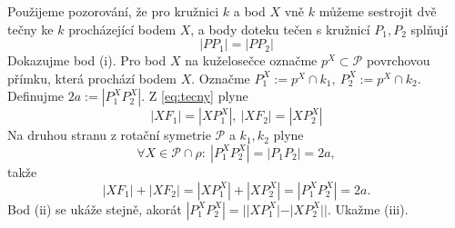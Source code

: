 \begin{důkaz}
  Použijeme pozorování, že pro kružnici $k$ a bod $X$ vně $k$ můžeme sestrojit dvě tečny ke $k$ procházející bodem $X$, a body doteku tečen s kružnicí $P_1, P_2$ splňují
  \begin{equation}\label{eq:tecny}
    |PP_1|=|PP_2|
  \end{equation}
  Dokazujme bod (i). Pro bod $X$ na kuželosečce označme $p^X\subset \mathcal{P}$ povrchovou přímku, která prochází bodem $X$. Označme $P_1^X:=p^X\cap k_1,\ P_2^X:=p^X\cap k_2.$ Definujme $2a:=|P_1^XP_2^X|.$ Z \ref{eq:tecny} plyne
  \begin{equation*}
    |XF_1|=|XP_1^X|,\ |XF_2|=|XP_2^X|  
\end{equation*}
  Na druhou stranu z rotační symetrie $\mathcal{P}$ a $k_1,k_2$ plyne 
  \begin{equation*}
    \forall X\in \mathcal{P}\cap \rho\colon\ |P_1^XP_2^X|=|P_1P_2|=2a,
  \end{equation*}
  takže
  \begin{equation*}
    |XF_1|+|XF_2|=|XP_1^X|+|XP_2^X|=|P_1^XP_2^X|=2a.
  \end{equation*}
  Bod (ii) se ukáže stejně, akorát $|P_1^XP_2^X|=||XP_1^X|-|XP_2^X||.$
  Ukažme (iii). 
\end{důkaz}

